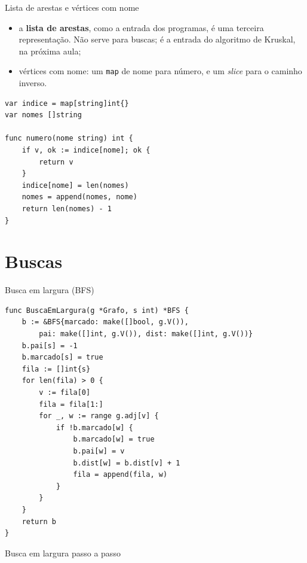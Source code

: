 \documentclass{beamer}
\begin{document}
\begin{frame}[fragile]{Lista de arestas e vértices com nome}
	\begin{itemize}
		\item a \textbf{lista de arestas}, como a entrada dos programas, é uma
		      terceira representação. Não serve para buscas; é a entrada do
		      algoritmo de Kruskal, na próxima aula;
		\item vértices com nome: um \texttt{map} de nome para número, e um
		      \textit{slice} para o caminho inverso.
	\end{itemize}

	\begin{verbatim}
var indice = map[string]int{}
var nomes []string

func numero(nome string) int {
	if v, ok := indice[nome]; ok {
		return v
	}
	indice[nome] = len(nomes)
	nomes = append(nomes, nome)
	return len(nomes) - 1
}
\end{verbatim}
\end{frame}

\section{Buscas}

\begin{frame}[fragile]{Busca em largura (BFS)}
	\begin{verbatim}
func BuscaEmLargura(g *Grafo, s int) *BFS {
	b := &BFS{marcado: make([]bool, g.V()),
		pai: make([]int, g.V()), dist: make([]int, g.V())}
	b.pai[s] = -1
	b.marcado[s] = true
	fila := []int{s}
	for len(fila) > 0 {
		v := fila[0]
		fila = fila[1:]
		for _, w := range g.adj[v] {
			if !b.marcado[w] {
				b.marcado[w] = true
				b.pai[w] = v
				b.dist[w] = b.dist[v] + 1
				fila = append(fila, w)
			}
		}
	}
	return b
}
\end{verbatim}
\end{frame}

\begin{frame}{Busca em largura passo a passo}
	\begin{center}
	\end{center}
\end{frame}
\end{document}
